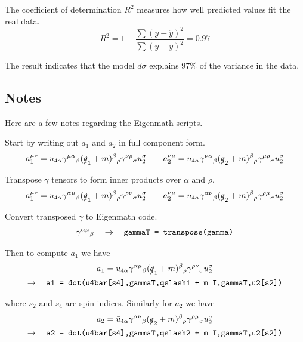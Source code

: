 \documentclass[12pt]{article}
\begin{document}
\noindent
The coefficient of determination $R^2$ measures how well predicted values fit the real data.
\begin{equation*}
R^2=1-\frac{\sum(y-\hat{y})^2}{\sum(y-\bar{y})^2}=0.97
\end{equation*}

\noindent
The result indicates that the model $d\sigma$ explains 97\% of the variance in the data.

\subsection*{Notes}
Here are a few notes regarding the Eigenmath scripts.

\bigskip
\noindent
Start by writing out $a_1$ and $a_2$ in full component form.
\begin{equation*}
a_1^{\mu\nu}
=\bar{u}_{4\alpha}\gamma^{\mu\alpha}{}_\beta(\slashed{q}_1+m)^\beta{}_\rho\gamma^{\nu\rho}{}_\sigma u_2^\sigma
\qquad
a_2^{\nu\mu}
=\bar{u}_{4\alpha}\gamma^{\nu\alpha}{}_\beta(\slashed{q}_2+m)^\beta{}_\rho\gamma^{\mu\rho}{}_\sigma u_2^\sigma
\end{equation*}

\noindent
Transpose $\gamma$ tensors to form inner products over $\alpha$ and $\rho$.
\begin{equation*}
a_1^{\mu\nu}
=\bar{u}_{4\alpha}\gamma^{\alpha\mu}{}_\beta(\slashed{q}_1+m)^\beta{}_\rho\gamma^{\rho\nu}{}_\sigma u_2^\sigma
\qquad
a_2^{\nu\mu}
=\bar{u}_{4\alpha}\gamma^{\alpha\nu}{}_\beta(\slashed{q}_2+m)^\beta{}_\rho\gamma^{\rho\mu}{}_\sigma u_2^\sigma
\end{equation*}

\noindent
Convert transposed $\gamma$ to Eigenmath code.
\begin{equation*}
\gamma^{\alpha\mu}{}_\beta
\quad\rightarrow\quad
\text{\tt gammaT = transpose(gamma)}
\end{equation*}

\noindent
Then to compute $a_1$ we have
\begin{multline*}
a_1=\bar{u}_{4\alpha}\gamma^{\alpha\mu}{}_\beta(\slashed{q}_1+m)^\beta{}_\rho\gamma^{\rho\nu}{}_\sigma u_2^\sigma
\\
\rightarrow\quad
\text{\tt a1 = dot(u4bar[s4],gammaT,qslash1 + m I,gammaT,u2[s2])}
\end{multline*}

\noindent
where $s_2$ and $s_4$ are spin indices.
Similarly for $a_2$ we have
\begin{multline*}
a_2=\bar{u}_{4\alpha}\gamma^{\alpha\nu}{}_\beta(\slashed{q}_2+m)^\beta{}_\rho\gamma^{\rho\mu}{}_\sigma u_2^\sigma
\\
\rightarrow\quad
\text{\tt a2 = dot(u4bar[s4],gammaT,qslash2 + m I,gammaT,u2[s2])}
\end{multline*}
\end{document}
